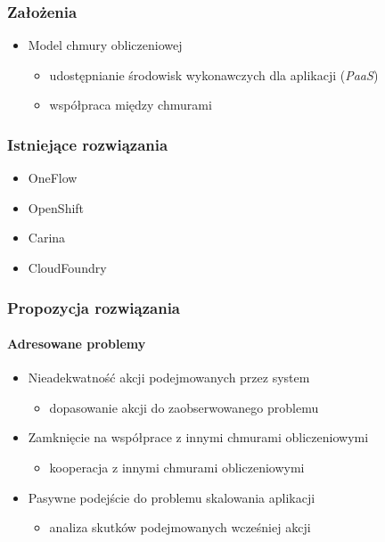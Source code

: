 \documentclass{beamer}
\begin{document}
\begin{frame}
\frametitle{Założenia}

\begin{itemize}
\item Model chmury obliczeniowej
	\begin{itemize}
		\item udostępnianie środowisk wykonawczych dla aplikacji (\textit{PaaS})
		\item współpraca między chmurami
	\end{itemize}
\end{itemize}

\end{frame}





\begin{frame}
\frametitle{Istniejące rozwiązania}

\begin{itemize}
\item OneFlow
\item OpenShift

\item Carina
\item CloudFoundry
\end{itemize}

\end{frame}



\begin{frame}
\frametitle{Propozycja rozwiązania}
\framesubtitle{Adresowane problemy}

\begin{itemize}
\item Nieadekwatność akcji podejmowanych przez system
		\begin{itemize}
			\item dopasowanie akcji do zaobserwowanego problemu
		\end{itemize}

\item Zamknięcie na współprace z innymi chmurami obliczeniowymi
		\begin{itemize}
			\item kooperacja z innymi chmurami obliczeniowymi
		\end{itemize}

\item Pasywne podejście do problemu skalowania aplikacji 
		\begin{itemize}
			\item analiza skutków podejmowanych wcześniej akcji
		\end{itemize}		
\end{itemize}
\end{frame}
\end{document}
